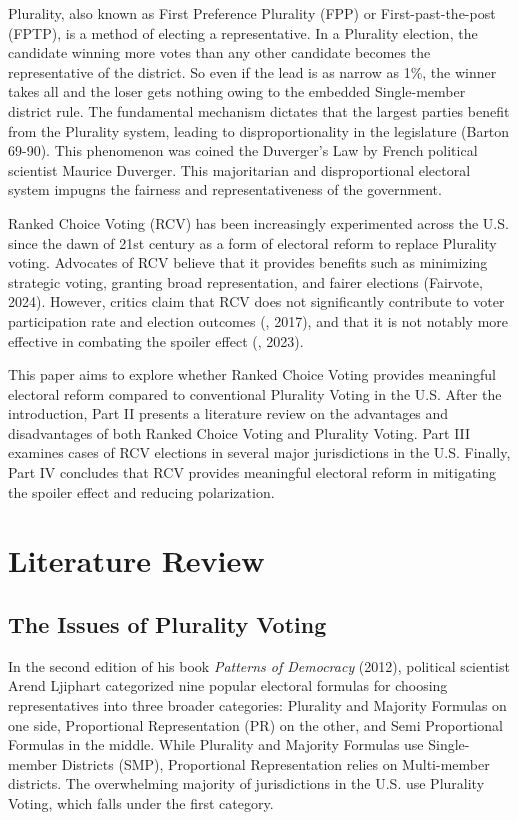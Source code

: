 Plurality, also known as First Preference Plurality (FPP) or First-past-the-post (FPTP), is a method of electing a representative. In a Plurality election, the candidate winning more votes than any other candidate becomes the representative of the district. So even if the lead is as narrow as 1\%, the winner takes all and the loser gets nothing owing to the embedded Single-member district rule. The fundamental mechanism dictates that the largest parties benefit from the Plurality system, leading to disproportionality in the legislature (Barton 69-90). This phenomenon was coined the Duverger’s Law by French political scientist Maurice Duverger. This majoritarian and disproportional electoral system impugns the fairness and representativeness of the government.

Ranked Choice Voting (RCV) has been increasingly experimented across the U.S. since the dawn of 21st century as a form of electoral reform to replace Plurality voting. Advocates of RCV believe that it provides benefits such as minimizing strategic voting, granting broad representation, and fairer elections (Fairvote, 2024). However, critics claim that RCV does not significantly contribute to voter participation rate and election outcomes (\cite{nielson2017}, 2017), and that it is not notably more effective in combating the spoiler effect (\cite{bristowjohnson2023}, 2023).

This paper aims to explore whether Ranked Choice Voting provides meaningful electoral reform compared to conventional Plurality Voting in the U.S. After the introduction, Part II presents a literature review on the advantages and disadvantages of both Ranked Choice Voting and Plurality Voting. Part III examines cases of RCV elections in several major jurisdictions in the U.S. Finally, Part IV concludes that RCV provides meaningful electoral reform in mitigating the spoiler effect and reducing polarization. 

\section{Literature Review}

\subsection{The Issues of Plurality Voting}

In the second edition of his book \emph{Patterns of Democracy} (2012), political scientist Arend Ljiphart categorized nine popular electoral formulas for choosing representatives into three broader categories: Plurality and Majority Formulas on one side, Proportional Representation (PR) on the other, and Semi Proportional Formulas in the middle. While Plurality and Majority Formulas use Single-member Districts (SMP), Proportional Representation relies on Multi-member districts. The overwhelming majority of jurisdictions in the U.S. use Plurality Voting, which falls under the first category. 

